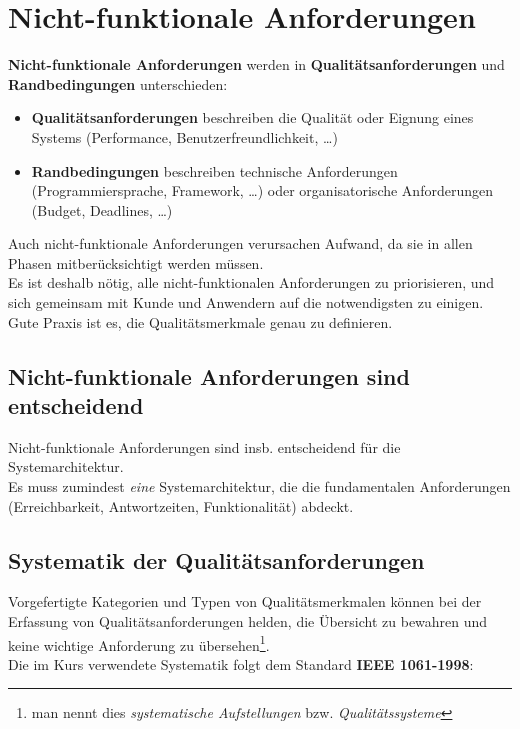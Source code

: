 \section{Nicht-funktionale Anforderungen}

\noindent
\textbf{Nicht-funktionale Anforderungen} werden in \textbf{Qualitätsanforderungen} und \textbf{Randbedingungen} unterschieden:

\begin{itemize}
    \item \textbf{Qualitätsanforderungen} beschreiben die Qualität oder Eignung eines Systems (Performance, Benutzerfreundlichkeit, \ldots)
    \item \textbf{Randbedingungen} beschreiben technische Anforderungen (Programmiersprache, Framework, \ldots) oder organisatorische Anforderungen (Budget, Deadlines, \ldots)
\end{itemize}

\noindent
Auch nicht-funktionale Anforderungen verursachen Aufwand, da sie in allen Phasen mitberücksichtigt werden müssen.\\
Es ist deshalb nötig, alle nicht-funktionalen Anforderungen zu priorisieren, und sich gemeinsam mit Kunde und Anwendern auf die notwendigsten zu einigen.\\
Gute Praxis ist es, die Qualitätsmerkmale genau zu definieren.

\subsection*{Nicht-funktionale Anforderungen sind entscheidend}
Nicht-funktionale Anforderungen sind insb. entscheidend für die Systemarchitektur.\\
Es muss zumindest \textit{eine} Systemarchitektur, die die fundamentalen Anforderungen (Erreichbarkeit, Antwortzeiten, Funktionalität) abdeckt.

\subsection*{Systematik der Qualitätsanforderungen}
Vorgefertigte Kategorien und Typen von Qualitätsmerkmalen können bei der Erfassung von Qualitätsanforderungen helden, die Übersicht zu bewahren und keine wichtige Anforderung zu übersehen\footnote{man nennt dies \textit{systematische Aufstellungen} bzw. \textit{Qualitätssysteme}}.\\

\noindent
Die im Kurs verwendete Systematik folgt dem Standard \textbf{IEEE 1061-1998}:

